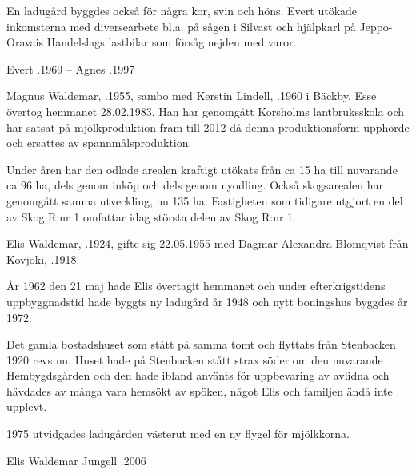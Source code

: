 En ladugård byggdes också för några kor, svin och höns. Evert utökade inkomsterna med diversearbete bl.a. på sågen i Silvast och hjälpkarl på
Jeppo-Oravais Handelslags lastbilar som försåg nejden med varor.

Evert .1969   --    Agnes .1997





Magnus Waldemar, .1955, sambo med Kerstin Lindell, .1960 i Bäckby, Esse övertog hemmanet 28.02.1983. Han har genomgått Korsholms lantbruksskola och har satsat på mjölkproduktion fram till 2012 då denna produktionsform upphörde och ersattes av spannmålsproduktion.

Under åren har den odlade arealen kraftigt utökats från ca 15 ha till nuvarande ca 96 ha, dels genom inköp och dels genom nyodling. Också skogsarealen har genomgått samma utveckling, nu 135 ha. Fastigheten som tidigare utgjort en del av Skog R:nr 1 omfattar idag största delen av Skog R:nr 1.


Elis Waldemar, .1924, gifte sig 22.05.1955 med Dagmar Alexandra Blomqvist från Kovjoki, .1918.

År 1962 den 21 maj hade Elis övertagit hemmanet och under efterkrigstidens uppbyggnadstid hade byggts ny ladugård år 1948 och nytt boningshus byggdes år 1972.

Det gamla bostadshuset som stått på samma tomt och flyttats från Stenbacken 1920 revs nu. Huset hade på Stenbacken stått strax söder om den nuvarande Hembygdsgården och den hade ibland använts för uppbevaring av avlidna och hävdades av många vara hemsökt av spöken, något Elis och familjen ändå inte upplevt.

1975 utvidgades ladugården västerut med en ny flygel för mjölkkorna.

\begin{jhchildren}
  \item {}
  \item {}
\end{jhchildren}

Elis Waldemar Jungell .2006


